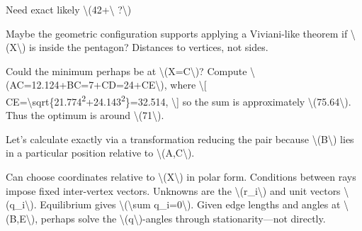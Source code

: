 \begin{decodedreasoningpanel}
Need exact likely \textbackslash{}(42+\textbackslash{} ?\textbackslash{})

Maybe the geometric configuration supports applying a Viviani-like theorem if \textbackslash{}(X\textbackslash{}) is inside the pentagon? Distances to vertices, not sides.

Could the minimum perhaps be at \textbackslash{}(X=C\textbackslash{})? Compute \textbackslash{}(AC=12.124+BC=7+CD=24+CE\textbackslash{}), where
\textbackslash{}[
CE=\textbackslash{}sqrt\{21.774\textsuperscript{2}+24.143\textsuperscript{2}\}=32.514,
\textbackslash{}]
so the sum is approximately \textbackslash{}(75.64\textbackslash{}). Thus the optimum is around \textbackslash{}(71\textbackslash{}).

Let's calculate exactly via a transformation reducing the pair because \textbackslash{}(B\textbackslash{}) lies in a particular position relative to \textbackslash{}(A,C\textbackslash{}).

Can choose coordinates relative to \textbackslash{}(X\textbackslash{}) in polar form. Conditions between rays impose fixed inter-vertex vectors. Unknowns are the \textbackslash{}(r\_i\textbackslash{}) and unit vectors \textbackslash{}(q\_i\textbackslash{}). Equilibrium gives \textbackslash{}(\textbackslash{}sum q\_i=0\textbackslash{}). Given edge lengths and angles at \textbackslash{}(B,E\textbackslash{}), perhaps solve the \textbackslash{}(q\textbackslash{})-angles through stationarity---not directly.


\end{decodedreasoningpanel}
